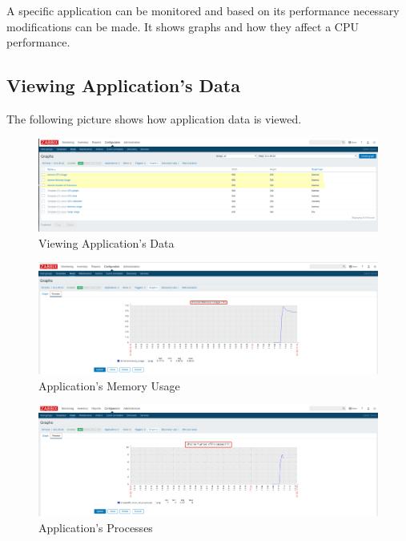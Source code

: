 \documentclass{article}
\begin{document}
A specific application can be monitored and based on its performance necessary modifications can be made.
It shows graphs and how they affect a CPU performance.



\subsection{ Viewing Application’s Data}

The following picture shows how application data is viewed. 

\begin{figure}[H]
\includegraphics[scale=0.3,width=\linewidth]{graphs_eklendi1}
\caption{Viewing Application's Data}
\end{figure}

\begin{figure}[H]
	\includegraphics[scale=0.3,width=\linewidth]{memory_usage}
	\caption{Application's Memory Usage}
\end{figure}

\begin{figure}[H]
	\includegraphics[scale=0.3,width=\linewidth]{number_of_processes}
	\caption{Application's Processes}
\end{figure}
\end{document}
